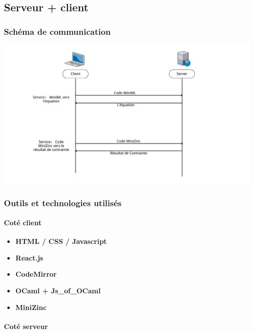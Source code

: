 \documentclass[
  12pt,
]{article}
\providecommand{\tightlist}{%
  \setlength{\itemsep}{0pt}\setlength{\parskip}{0pt}}
\begin{document}
\hypertarget{serveur-client}{%
\subsection{Serveur + client}\label{serveur-client}}

\hypertarget{schuxe9ma-de-communication}{%
\subsubsection{Schéma de
communication}\label{schuxe9ma-de-communication}}

\includegraphics{./MarkdownVersions/Rapport/communication.png}

\hypertarget{outils-et-technologies-utilisuxe9s-1}{%
\subsubsection{Outils et technologies
utilisés}\label{outils-et-technologies-utilisuxe9s-1}}

\hypertarget{cotuxe9-client}{%
\paragraph{Coté client}\label{cotuxe9-client}}

\begin{itemize}
\tightlist
\item
  \textbf{HTML / CSS / Javascript}
\item
  \textbf{React.js}
\item
  \textbf{CodeMirror}
\item
  \textbf{OCaml + Js\_of\_OCaml}
\item
  \textbf{MiniZinc}
\end{itemize}

\hypertarget{cotuxe9-serveur}{%
\paragraph{Coté serveur}\label{cotuxe9-serveur}}
\end{document}
